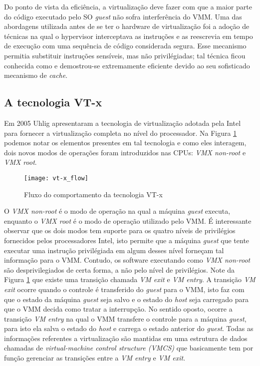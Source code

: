 Do ponto de vista da eficiência, a virtualização deve fazer com que a maior
parte do código executado pelo SO \emph{guest} não sofra interferência do VMM.
Uma das abordagens utilizada antes de se ter o hardware de virtualização foi a
adoção de técnicas na qual o hypervisor interceptava as instruções e as
reescrevia em tempo de execução com uma sequência de código considerada segura.
Esse mecanismo permitia substituir instruções sensíveis, mas não privilégiadas;
tal técnica ficou conhecida como  e demostrou-se
extremamente eficiente devido ao seu sofisticado mecanismo de \emph{cache}.


\subsection{A tecnologia VT-x}
\label{sec:vtx}

Em 2005 Uhlig \citep{uhlig} apresentaram a tecnologia de virtualização adotada
pela Intel para fornecer a virtualização completa no nível do processador. Na
Figura \ref{fig:vt-x_flow} podemos notar os elementos presentes em tal
tecnologia e como eles interagem, dois novos modos de operações foram
introduzidos nas CPUs: \emph{VMX non-root} e \emph{VMX root}.

\begin{figure}[!h]
  \centering
  \texttt{[image: vt-x\_flow]} 
  \caption{Fluxo do comportamento da tecnologia VT-x}
  \label{fig:vt-x_flow}
\end{figure}

O \emph{VMX non-root} é o modo de operação na qual a máquina \emph{guest}
executa, enquanto o \emph{VMX root} é o modo de operação utilizado pelo VMM. É
interessante observar que os dois modos tem suporte para os quatro níveis de
privilégios fornecidos pelos processadores Intel, isto permite que a máquina
\emph{guest} que tente executar uma instrução privilégiada em algum desses
nível forneçam tal informação para o VMM. Contudo, os software executando como
\emph{VMX non-root} são desprivilegiados de certa forma, a não pelo nível de
privilégios. Note da Figura \ref{fig:vt-x_flow} que existe uma transição chamada
\emph{VM exit} e \emph{VM entry}. A transição \emph{VM exit} ocorre quando o
controle é transferido do \emph{guest} para o VMM, isto faz com que o estado da
máquina \emph{guest} seja salvo e o estado do \emph{host} seja carregado para
que o VMM decida como tratar a interrupção. No sentido oposto, ocorre a
transição \emph{VM entry} na qual o VMM transfere o controle para a máquina
\emph{guest}, para isto ela salva o estado do \emph{host} e carrega o estado
anterior do \emph{guest}. Todas as informações referentes a virtualização são
mantidas em uma estrutura de dados chamadas de \emph{virtual-machine control
structure (VMCS)} que basicamente tem por função gerenciar as transições entre
a \emph{VM entry} e \emph{VM exit}.

